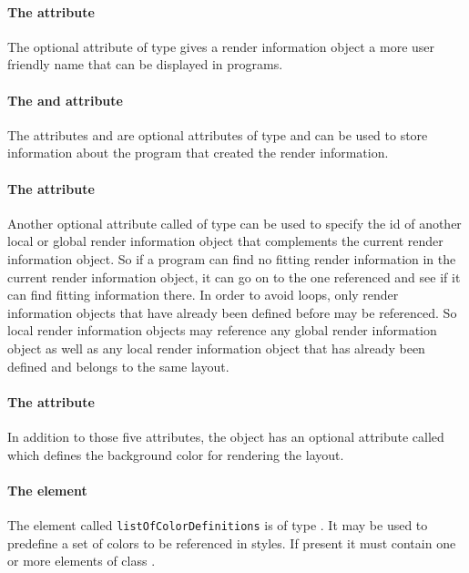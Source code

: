 \paragraph{The  attribute}
The optional attribute  of type  gives a 
render information object a more user friendly name that can be displayed 
in programs.

\paragraph{The  and   attribute}
The attributes  and  are optional attributes of 
type  and can be used to store information about the program 
that created the render information. 

\paragraph{The  attribute}
Another optional attribute called  of type
 can be used to specify the id of another local or global render information object 
that complements the current render information object. So if a program can 
find no fitting render information in the current render information object, it 
can go on to the one referenced and see if it can find fitting information 
there. In order to avoid loops, only render information objects that have 
already been defined before may be referenced. So local render information 
objects may reference any global render information object as well as any local 
render information object that has already been defined and belongs to the same layout. 

\paragraph{The  attribute}
In addition to those five attributes, the \RenderInformationBase object has an optional
attribute called  which defines the background color for rendering the layout.

\paragraph{The \ListOfColorDefinitions element}
\label{listofcolordefinitions-class}
The element called \texttt{listOf\-Color\-Definitions} is of type \ListOfColorDefinitions. It may be 
used to predefine a set of colors to be referenced in styles. If present it must contain one or more
elements of class \ColorDefinition.

